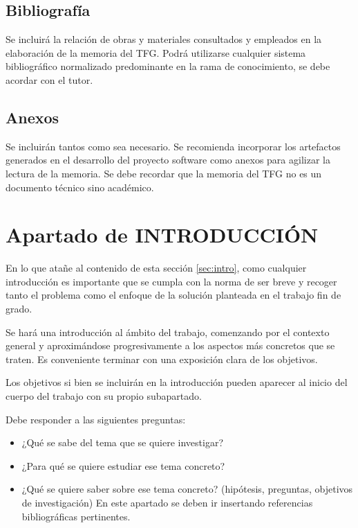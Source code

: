  \section{Bibliografía}
  Se  incluirá    la  relación  de  obras  y  materiales consultados  y  empleados  en  la  elaboración  de  la  memoria  del  TFG.
   Podrá  utilizarse  cualquier  sistema bibliográfico normalizado    predominante    en    la    rama    de conocimiento, se debe acordar con el tutor.

 \section{Anexos}
Se incluirán tantos como sea necesario. Se recomienda incorporar los artefactos generados en el desarrollo del proyecto software como anexos para agilizar la lectura de la memoria. Se debe recordar que la memoria del TFG no es un documento técnico sino académico.



 
 \chapter {Apartado de INTRODUCCIÓN}


En lo que atañe al contenido de esta sección \ref{sec:intro}, como cualquier introducción es importante que se cumpla con la norma de ser breve y recoger tanto el problema como el enfoque de la solución planteada en el trabajo fin de grado.

Se hará una introducción al ámbito del trabajo, comenzando por el contexto general y aproximándose progresivamente a los aspectos más concretos que se traten. Es conveniente  terminar  con  una  exposición  clara  de  los  objetivos.

Los objetivos si bien se incluirán en la introducción pueden aparecer al inicio del cuerpo del trabajo con su propio subapartado.

Debe responder a las siguientes preguntas:
\begin{itemize}
    \item ¿Qué se sabe del tema que se quiere investigar?
    \item ¿Para qué se quiere estudiar ese tema concreto?
    \item ¿Qué  se  quiere  saber  sobre  ese  tema  concreto?  (hipótesis, preguntas, objetivos de investigación) En  este  apartado  se  deben  ir  insertando  referencias  bibliográficas pertinentes.
\end{itemize}

